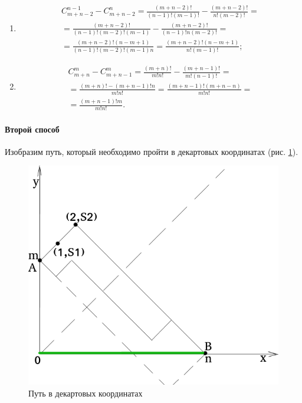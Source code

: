 \begin{enumerate}[label=\alph*)]
\begin{enumerate}[label=(\roman*)]
\item
\begin{equation*}
\begin{split}
C_{m+n-2}^{n-1} - C_{m+n-2}^n =
\frac{ \left( m+n-2 \right)!}{ \left( n-1 \right)! \left( m-1 \right)!} -
\frac{ \left( m+n-2 \right)!}{n! \left( m-2 \right)!} = \\
= \frac{ \left( m+n-2 \right)!}{ \left( n-1 \right)! \left( m-2 \right)! \left( m-1 \right)} -
\frac{ \left( m+n-2 \right)!}{ \left( n-1 \right)!n \left( m-2 \right)!}= \\
= \frac{ \left( m+n-2 \right)! \left( n-m+1 \right) }{\left( n-1 \right)! \left( m-2 \right)! \left( m-1 \right) n} =
\frac{ \left( m+n-2 \right)! \left( n-m+1 \right) }{n! \left( m-1 \right)!};
\end{split}
\end{equation*}
\item 
\begin{equation*}
\begin{split}
C_{m+n}^m - C_{m+n-1}^m =
\frac{ \left( m+n \right)!}{m! n!} - \frac{ \left( m+n-1 \right)!}{m! \left( n-1 \right)!} = \\
= \frac{ \left( m+n \right)! - \left( m+n-1 \right)!n}{m!n!} =
\frac{ \left( m+n-1 \right)! \left( m+n-n \right) }{m!n!} = \\
= \frac{ \left( m+n-1 \right)! m}{m!n!}.
\end{split}
\end{equation*}
\end{enumerate}

\paragraph*{Второй способ}

Изобразим путь, который необходимо пройти в декартовых координатах (рис. \ref{fig:4223}).

\begin{figure}[h!]
  \centering
  \includegraphics[width=.6\textwidth]{./pictures/4_22_3.png}
  \caption{Путь в декартовых координатах}
  \label{fig:4223}
\end{figure}


\end{enumerate}
